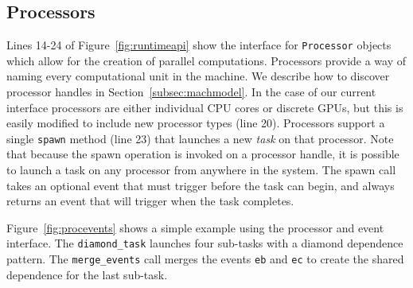 \subsection{Processors}
\label{subsec:procs}
Lines 14-24 of Figure~\ref{fig:runtimeapi} show the interface for {\tt Processor} objects which allow for
the creation of parallel computations.  Processors provide a way of naming 
every computational unit in the machine.  We describe how to discover processor handles
in Section~\ref{subsec:machmodel}.  In the case of our current interface 
processors are either individual CPU cores or discrete GPUs, but this is easily modified 
to include new processor types (line 20).   Processors support a single {\tt spawn}
method (line 23) that launches a new {\em task} on that processor.
Note that because the spawn operation
is invoked on a processor handle, it is possible to launch a task on any
processor from anywhere in the system.  
The spawn call takes an optional event that must trigger before the task can begin, and
always returns an event that will trigger when the task completes.

Figure~\ref{fig:procevents} shows a simple example using 
the processor and event interface.  The {\tt diamond\_task} launches four
sub-tasks with a diamond dependence pattern.
The {\tt merge\_events} call
merges the events {\tt eb} and {\tt ec} to create the shared dependence
for the last sub-task.

